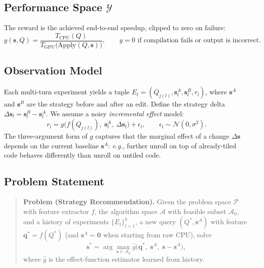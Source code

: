 \documentclass{article}
\begin{document}
\subsection{Performance Space $\mathcal{Y}$}
The reward is the achieved end-to-end speedup, clipped to zero on
failure:
\begin{equation}
y(\mathbf{s}, Q) = \frac{T_{\mathrm{CPU}}(Q)}{T_{\mathrm{GPU}}\bigl(\mathrm{Apply}(Q, \mathbf{s})\bigr)},
\qquad
y = 0 \text{ if compilation fails or output is incorrect}.
\label{eq:reward}
\end{equation}

\subsection{Observation Model}
Each multi-turn experiment yields a tuple
$E_l = (Q_{j(l)}, \mathbf{s}_l^A, \mathbf{s}_l^B, r_l)$, where
$\mathbf{s}^A$ and $\mathbf{s}^B$ are the strategy before and after
an edit. Define the strategy delta
$\Delta \mathbf{s}_l = \mathbf{s}_l^B - \mathbf{s}_l^A$.
We assume a noisy \emph{incremental effect} model:
\begin{equation}
r_l = g\bigl(f(Q_{j(l)}),\; \mathbf{s}_l^A,\; \Delta \mathbf{s}_l\bigr)
      + \epsilon_l, \qquad
\epsilon_l \sim \mathcal{N}(0, \sigma^2).
\label{eq:incremental}
\end{equation}
The three-argument form of $g$ captures that the marginal effect of a
change $\Delta\mathbf{s}$ depends on the current baseline
$\mathbf{s}^A$: \emph{e.g.}, further unroll on top of already-tiled code
behaves differently than unroll on untiled code.

\subsection{Problem Statement}
\label{sec:problem}
\begin{quote}
\textbf{Problem (Strategy Recommendation).}
Given the problem space $\mathcal{P}$ with feature extractor $f$,
the algorithm space $\mathcal{A}$ with feasible subset
$\mathcal{A}_0$, and a history of experiments
$\{E_l\}_{l=1}^{k}$, a new query
$(Q^*, \mathbf{s}^A)$ with feature
$\mathbf{q}^* = f(Q^*)$ (and $\mathbf{s}^A = \mathbf{0}$ when starting
from raw CPU), solve
\begin{equation}
\mathbf{s}^* = \arg\max_{\mathbf{s} \in \mathcal{A}_0}
  \hat{g}\bigl(\mathbf{q}^*,\; \mathbf{s}^A,\; \mathbf{s} - \mathbf{s}^A\bigr),
\label{eq:objective}
\end{equation}
where $\hat{g}$ is the effect-function estimator learned from history.
\end{quote}
\end{document}
